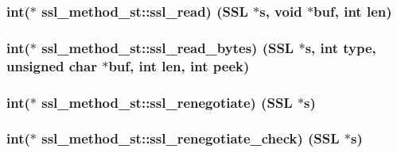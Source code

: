\subsubsection[{\texorpdfstring{ssl\+\_\+read}{ssl_read}}]{\setlength{\rightskip}{0pt plus 5cm}int($\ast$ ssl\+\_\+method\+\_\+st\+::ssl\+\_\+read) ({\bf S\+SL} $\ast$s, void $\ast$buf, int {\bf len})}\hypertarget{structssl__method__st_a113246b4c830059207f54935b8874289}{}\label{structssl__method__st_a113246b4c830059207f54935b8874289}
\subsubsection[{\texorpdfstring{ssl\+\_\+read\+\_\+bytes}{ssl_read_bytes}}]{\setlength{\rightskip}{0pt plus 5cm}int($\ast$ ssl\+\_\+method\+\_\+st\+::ssl\+\_\+read\+\_\+bytes) ({\bf S\+SL} $\ast$s, int {\bf type}, unsigned char $\ast$buf, int {\bf len}, int peek)}\hypertarget{structssl__method__st_a9f992bd27f8e79cf166c9783bdc29932}{}\label{structssl__method__st_a9f992bd27f8e79cf166c9783bdc29932}
\subsubsection[{\texorpdfstring{ssl\+\_\+renegotiate}{ssl_renegotiate}}]{\setlength{\rightskip}{0pt plus 5cm}int($\ast$ ssl\+\_\+method\+\_\+st\+::ssl\+\_\+renegotiate) ({\bf S\+SL} $\ast$s)}\hypertarget{structssl__method__st_a68ba7cb568d9c9c3e2bd15020a30beb0}{}\label{structssl__method__st_a68ba7cb568d9c9c3e2bd15020a30beb0}
\subsubsection[{\texorpdfstring{ssl\+\_\+renegotiate\+\_\+check}{ssl_renegotiate_check}}]{\setlength{\rightskip}{0pt plus 5cm}int($\ast$ ssl\+\_\+method\+\_\+st\+::ssl\+\_\+renegotiate\+\_\+check) ({\bf S\+SL} $\ast$s)}\hypertarget{structssl__method__st_a07e92db03c1a7907ed8346916c038215}{}\label{structssl__method__st_a07e92db03c1a7907ed8346916c038215}
